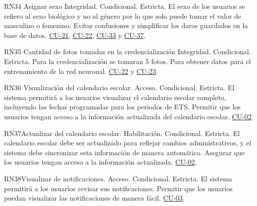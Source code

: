 \begin{BussinesRule}{RN34} {Asignar sexo }
    \BRitem[Tipo:]Integridad.
    \BRitem[Clase:]Condicional.
    \BRitem[Nivel:] Estricta.
    \BRitem[Descripción:] El sexo de los usuarios se refiero al sexo biológico y no al género por lo que solo puede tomar el valor de masculino o femenino.
    \BRitem[Motivación:] Evitar confusiones y simplificar los daros guardados en la base de datos.
     \hyperlink{CU-21}{CU-21}, \hyperlink{CU-22}{CU-22}, \hyperlink{CU-33}{CU-33} y \hyperlink{CU-37}{CU-37}.
    \end{BussinesRule}

\begin{BussinesRule}{RN35} {Cantidad de fotos tomadas en la credencialización }
    \BRitem[Tipo:]Integridad.
    \BRitem[Clase:]Condicional.
    \BRitem[Nivel:] Estricta.
    \BRitem[Descripción:] Para la credencialización se tomaran 5 fotos.
    \BRitem[Motivación:] Para obtener datos para el entrenamiento de la red neuronal.
     \hyperlink{CU-22}{CU-22} y \hyperlink{CU-23}{CU-23}.
    \end{BussinesRule}

\begin{BussinesRule}{RN36} {Visualización del calendario escolar.}
    \BRitem[Tipo:] Acceso.
    \BRitem[Clase:] Condicional.
    \BRitem[Nivel:] Estricta.
    \BRitem[Descripción:] El sistema permitirá a los usuarios visualizar el calendario escolar completo, incluyendo las fechas programadas para los periodos de ETS.
    \BRitem[Motivación:] Permitir que los usuarios tengan acceso a la información actualizada del calendario escolar.
     \hyperlink{CU-02}{CU-02}.
    \end{BussinesRule}

\begin{BussinesRule}{RN37}{Actualizar del calendario escolar.}
    \BRitem[Tipo:] Habilitación.
    \BRitem[Clase:] Condicional.
    \BRitem[Nivel:] Estricta.
    \BRitem[Descripción:] El calendario escolar debe ser actualizado para reflejar cambios administrativos, y el sistema debe sincronizar esta información de manera automática.
    \BRitem[Motivación:] Asegurar que los usuarios tengan acceso a la información actualizada.
     \hyperlink{CU-02}{CU-02}.
    \end{BussinesRule}

\begin{BussinesRule}{RN38}{Visualizar de notificaciones.}
    \BRitem[Tipo:] Acceso.
    \BRitem[Clase:] Condicional.
    \BRitem[Nivel:] Estricta.
    \BRitem[Descripción:] El sistema permitirá a los usuarios revisar sus notificaciones.
    \BRitem[Motivación:] Permitir que los usuarios puedan visualizar las notificaciones de manera fácil.
     \hyperlink{CU-03}{CU-03}.
    \end{BussinesRule}

